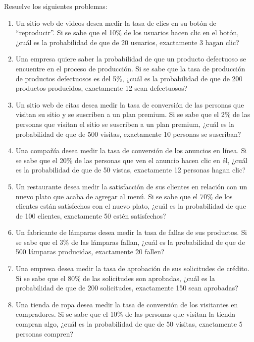 \begin{Ejer}
Resuelve los siguientes problemas:

\begin{enumerate}
    \item Un sitio web de videos desea medir la tasa de clics en su botón de ``reproducir''. Si se sabe que el 10\% de los usuarios hacen clic en el botón, ¿cuál es la probabilidad de que de 20 usuarios, exactamente 3 hagan clic?

    \item Una empresa quiere saber la probabilidad de que un producto defectuoso se encuentre en el proceso de producción. Si se sabe que la tasa de producción de productos defectuosos es del 5\%, ¿cuál es la probabilidad de que de 200 productos producidos, exactamente 12 sean defectuosos?

    \item Un sitio web de citas desea medir la tasa de conversión de las personas que visitan su sitio y se suscriben a un plan premium. Si se sabe que el 2\% de las personas que visitan el sitio se suscriben a un plan premium, ¿cuál es la probabilidad de que de 500 visitas, exactamente 10 personas se suscriban?

    \item Una compañía desea medir la tasa de conversión de los anuncios en línea. Si se sabe que el 20\% de las personas que ven el anuncio hacen clic en él, ¿cuál es la probabilidad de que de 50 vistas, exactamente 12 personas hagan clic?

    \item Un restaurante desea medir la satisfacción de sus clientes en relación con un nuevo plato que acaba de agregar al menú. Si se sabe que el 70\% de los clientes están satisfechos con el nuevo plato, ¿cuál es la probabilidad de que de 100 clientes, exactamente 50 estén satisfechos?

    \item Un fabricante de lámparas desea medir la tasa de fallas de sus productos. Si se sabe que el 3\% de las lámparas fallan, ¿cuál es la probabilidad de que de 500 lámparas producidas, exactamente 20 fallen?

    \item Una empresa desea medir la tasa de aprobación de sus solicitudes de crédito. Si se sabe que el 80\% de las solicitudes son aprobadas, ¿cuál es la probabilidad de que de 200 solicitudes, exactamente 150 sean aprobadas?

    \item Una tienda de ropa desea medir la tasa de conversión de los visitantes en compradores. Si se sabe que el 10\% de las personas que visitan la tienda compran algo, ¿cuál es la probabilidad de que de 50 visitas, exactamente 5 personas compren?


\end{enumerate}
\end{Ejer}
